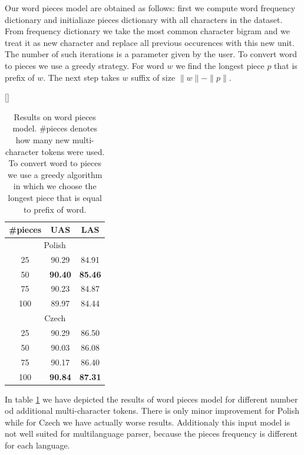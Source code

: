 Our word pieces model are obtained as follows:
first we compute word frequency dictionary  and initialiaze pieces dictionary with all characters in the dataset.
From frequency dictionary we take the most common character bigram and we treat it as new character and replace all previous occurences
with this new unit. The number of such iterations is a parameter given by the user.
To convert word to pieces we use a greedy strategy. For word $w$ we find the longest
piece $p$ that is prefix of $w$. The next step takes $w$ suffix of size $\|w\| - \|p\|$.

\begin{table}[!htbp]
    [\FBwidth]
    {\caption{Results on word pieces model. \#pieces denotes how many new
    multi-character tokens were used. To convert word to pieces we
    use a greedy algorithm in which we choose the longest piece that is equal
    to prefix of word.}
    \label{tab:word_pieces}}
{
    \begin{tabular}{c c c}
        \#pieces & UAS & LAS \\ \hline
        \multicolumn{3}{c}{Polish}\\
        25 & 90.29 &  84.91 \\
        50 & \textbf{90.40} &  \textbf{85.46}\\
        75 &  90.23 & 84.87\\
        100 & 89.97 & 84.44\\\hline
        \multicolumn{3}{c}{Czech}\\
        25 & 90.29 & 86.50\\
        50 & 90.03 & 86.08\\
        75 & 90.17 & 86.40\\
        100 & \textbf{90.84} & \textbf{87.31}
    \end{tabular}
}
\end{table}

In table \ref{tab:word_pieces} we have depicted the results of word pieces model
for different number od additional multi-character tokens. There is only minor
improvement for Polish while for Czech we have actually worse results. Additionaly
this input model is not well suited for multilanguage parser, because the pieces
frequency is different for each language.

